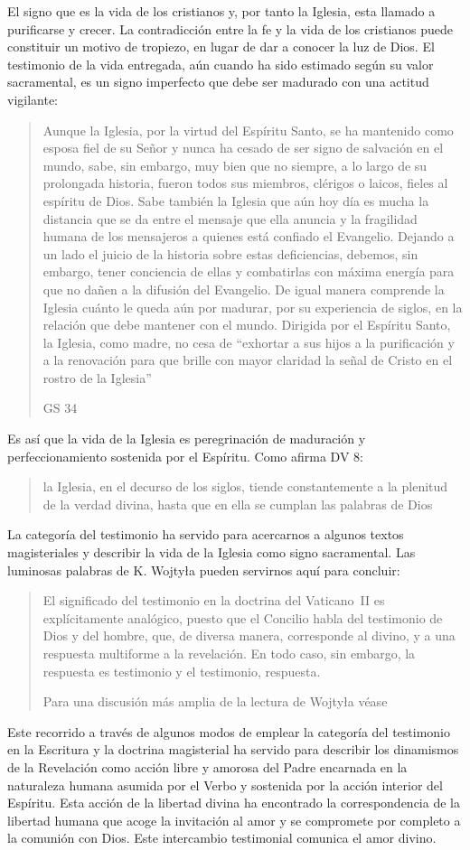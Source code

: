 El signo que es la vida de los cristianos y, por tanto la Iglesia, esta llamado a purificarse y crecer. La contradicción entre la fe y la vida de los cristianos puede constituir un motivo de tropiezo, en lugar de dar a conocer la luz de Dios. El testimonio de la vida entregada, aún cuando ha sido estimado según su valor sacramental, es un signo imperfecto que debe ser madurado con una actitud vigilante: \blockquote[GS 34]{Aunque la Iglesia, por la virtud del Espíritu Santo, se ha mantenido como esposa fiel de su Señor y nunca ha cesado de ser signo de salvación en el mundo, sabe, sin embargo, muy bien que no siempre, a lo largo de su prolongada historia, fueron todos sus miembros, clérigos o laicos, fieles al espíritu de Dios. Sabe también la Iglesia que aún hoy día es mucha la distancia que se da entre el mensaje que ella anuncia y la fragilidad humana de los mensajeros a quienes está confiado el Evangelio. Dejando a un lado el juicio de la historia sobre estas deficiencias, debemos, sin embargo, tener conciencia de ellas y combatirlas con máxima energía para que no dañen a la difusión del Evangelio. De igual manera comprende la Iglesia cuánto le queda aún por madurar, por su experiencia de siglos, en la relación que debe mantener con el mundo. Dirigida por el Espíritu Santo, la Iglesia, como madre, no cesa de ``exhortar a sus hijos a la purificación y a la renovación para que brille con mayor claridad la señal de Cristo en el rostro de la Iglesia''}. Es así que la vida de la Iglesia es peregrinación de maduración y perfeccionamiento sostenida por el Espíritu. Como afirma DV 8: \blockquote{la Iglesia, en el decurso de los siglos, tiende constantemente a la plenitud de la verdad divina, hasta que en ella se cumplan las palabras de Dios}.

La categoría del testimonio ha servido para acercarnos a algunos textos magisteriales y describir la vida de la Iglesia como signo sacramental. Las luminosas palabras de K. Wojtyła pueden servirnos aquí para concluir: \blockquote[Para una discusión más amplia de la lectura de Wojtyła véase {\cite[194--197]{prades2015testimonio}}]{El significado del testimonio en la doctrina del Vaticano~II es explícitamente analógico, puesto que el Concilio habla del testimonio de Dios y del hombre, que, de diversa manera, corresponde al divino, y a una respuesta multiforme a la revelación. En todo caso, sin embargo, la respuesta es testimonio y el testimonio, respuesta.}

Este recorrido a través de algunos modos de emplear la categoría del testimonio en la Escritura y la doctrina magisterial ha servido para describir los dinamismos de la Revelación como acción libre y amorosa del Padre encarnada en la naturaleza humana asumida por el Verbo y sostenida por la acción interior del Espíritu. Esta acción de la libertad divina ha encontrado la correspondencia de la libertad humana que acoge la invitación al amor y se compromete por completo a la comunión con Dios. Este intercambio testimonial comunica el amor divino.
